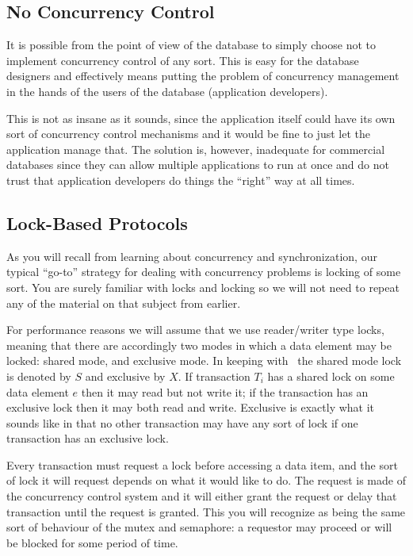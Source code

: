 \documentclass[a4paper]{report}
\begin{document}
\subsection*{No Concurrency Control}

It is possible from the point of view of the database to simply choose not to implement concurrency control of any sort. This is easy for the database designers and effectively means putting the problem of concurrency management in the hands of the users of the database (application developers).

This is not as insane as it sounds, since the application itself could have its own sort of concurrency control mechanisms and it would be fine to just let the application manage that. The solution is, however, inadequate for commercial databases since they can allow multiple applications to run at once and do not trust that application developers do things the ``right'' way at all times.

\subsection*{Lock-Based Protocols}

As you will recall from learning about concurrency and synchronization, our typical ``go-to'' strategy for dealing with concurrency problems is locking of some sort. You are surely familiar with locks and locking so we will not need to repeat any of the material on that subject from earlier.

For performance reasons we will assume that we use reader/writer type locks, meaning that there are accordingly two modes in which a data element may be locked: shared mode, and exclusive mode. In keeping with~\cite{dsc} the shared mode lock is denoted by $S$ and exclusive by $X$. If transaction $T_{i}$ has a shared lock on some data element $e$ then it may read but not write it; if the transaction has an exclusive lock then it may both read and write. Exclusive is exactly what it sounds like in that no other transaction may have any sort of lock if one transaction has an exclusive lock.

Every transaction must request a lock before accessing a data item, and the sort of lock it will request depends on what it would like to do. The request is made of the concurrency control system and it will either grant the request or delay that transaction until the request is granted. This you will recognize as being the same sort of behaviour of the mutex and semaphore: a requestor may proceed or will be blocked for some period of time.
\end{document}
